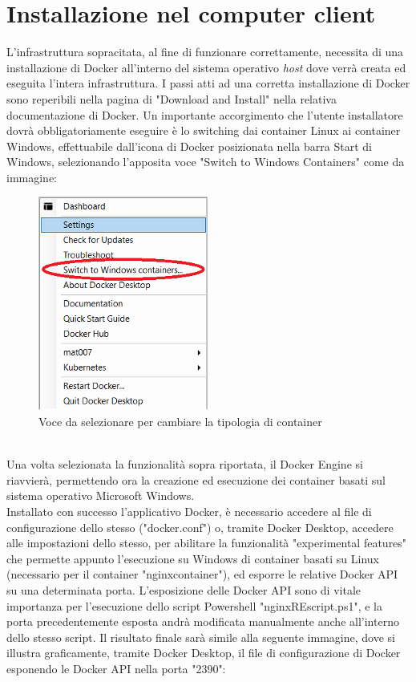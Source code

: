 \section{Installazione nel computer client}
L'infrastruttura sopracitata, al fine di funzionare correttamente, necessita di una installazione di Docker all'interno del sistema operativo \textit{host} dove verrà creata ed eseguita l'intera infrastruttura.
I passi atti ad una corretta installazione di Docker sono reperibili nella pagina di "Download and Install" nella relativa documentazione di Docker. Un importante accorgimento che l'utente installatore dovrà obbligatoriamente eseguire è lo switching dai container Linux ai container Windows, effettuabile dall'icona di Docker posizionata nella barra Start di Windows, selezionando l'apposita voce "Switch to Windows Containers" come da immagine:
\begin{figure}[!h]     
\centering 
    \includegraphics[width=0.2\columnwidth]{immagini/img/switch_windows_container} 
    \caption{Voce da selezionare per cambiare la tipologia di container}
\end{figure}\\
Una volta selezionata la funzionalità sopra riportata, il Docker Engine si riavvierà, permettendo ora la creazione ed esecuzione dei container basati sul sistema operativo Microsoft Windows.\\
Installato con successo l'applicativo Docker, è necessario accedere al file di configurazione dello stesso ("docker.conf") o, tramite Docker Desktop, accedere alle impostazioni dello stesso, per abilitare la funzionalità "experimental features" che permette appunto l'esecuzione su Windows di container basati su Linux (necessario per il container "nginxcontainer"), ed esporre le relative Docker API su una determinata porta.
L'esposizione delle Docker API sono di vitale importanza per l'esecuzione dello script Powershell "nginxREscript.ps1", e la porta precedentemente esposta andrà modificata manualmente anche all'interno dello stesso script.
Il risultato finale sarà simile alla seguente immagine, dove si illustra graficamente, tramite Docker Desktop, il file di configurazione di Docker esponendo le Docker API nella porta "2390":
